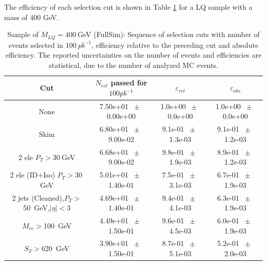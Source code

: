 \documentclass{cmspaper}
\begin{document}
\begin{linenumbers}
The efficiency of each selection cut is shown in Table \ref{tab:effic-MLQ400} 
for a LQ sample with a mass of 400 GeV. 


\begin{table}[htbp] 
\begin{center} 
\begin{tabular}{|c|c|c|c|} 
\hline\hline 
 Cut & $N_{evt}$ passed for $100pb^{-1}$ & $\varepsilon_{rel}$ & $\varepsilon_{abs}$ \\ 
\hline\hline 
None       &        7.50e+01       $~\pm~$       0.00e+00        &        1.0e+00       $~\pm~$       0.0e+00        &        1.0e+00       $~\pm~$       0.0e+00       \\       
       Skim       &        6.80e+01       $~\pm~$       9.00e-02        &        9.1e-01       $~\pm~$       1.3e-03        &        9.1e-01       $~\pm~$       1.2e-03       \\       
       2 ele $P_T>30~$GeV       &        6.68e+01       $~\pm~$       9.00e-02        &        9.8e-01       $~\pm~$       1.9e-03        &        8.9e-01       $~\pm~$       1.2e-03       \\       
       2 ele (ID+Iso) $P_T>30~$GeV       &        5.01e+01       $~\pm~$       1.40e-01        &        7.5e-01       $~\pm~$       3.1e-03        &        6.7e-01       $~\pm~$       1.9e-03       \\       
       2 jets (Cleaned),$P_T>$50~GeV,$|\eta|<$3       &        4.69e+01       $~\pm~$       1.40e-01        &        9.4e-01       $~\pm~$       4.1e-03        &        6.3e-01       $~\pm~$       1.9e-03       \\       
       $M_{ee}>$100~GeV       &        4.49e+01       $~\pm~$       1.50e-01        &        9.6e-01       $~\pm~$       4.5e-03        &        6.0e-01       $~\pm~$       1.9e-03       \\       
       $S_T>$620~GeV       &        3.90e+01       $~\pm~$       1.50e-01        &        8.7e-01       $~\pm~$       5.1e-03        &        5.2e-01       $~\pm~$       2.0e-03       \\       
          \hline\hline 
\end{tabular} 
\end{center} 
\caption{Sample of $M_{LQ}=400~$GeV (FullSim): Sequence of selection cuts with number of events selected in 100$~pb^{-1}$, efficiency relative to the preceding cut and absolute efficiency. The reported uncertainties on the number of events and efficiencies are statistical, due to the number of analyzed MC events.} 
\label{tab:effic-MLQ400} 
\end{table} 




\end{linenumbers}
\end{document}

